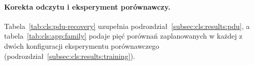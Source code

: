 
\paragraph{Korekta odczytu i eksperyment porównawczy.}
Tabela~\ref{tab:cls:pdu-recovery} uzupełnia podrozdział~\ref{subsec:cls:results:pdu}, a tabela~\ref{tab:cls:app:family} podaje pięć porównań zaplanowanych w każdej z dwóch konfiguracji eksperymentu porównawczego (podrozdział~\ref{subsec:cls:results:training}).

